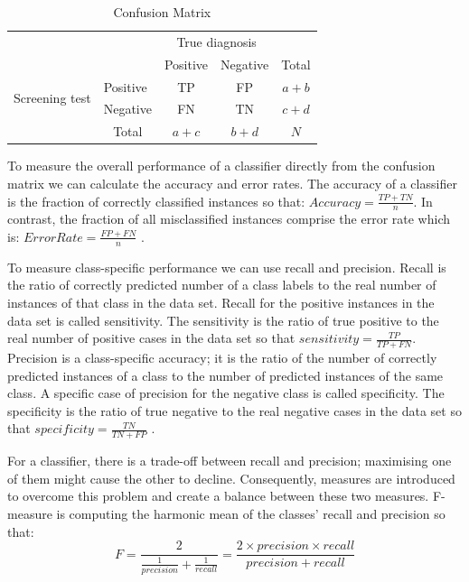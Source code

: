 \begin{table}[!h]
    \centering
    \begin{tabular}{l|l|c|c|c}
        \multicolumn{2}{c}{}&\multicolumn{2}{c}{True diagnosis}&\\
        \cline{3-4}
        \multicolumn{2}{c|}{}&Positive&Negative&\multicolumn{1}{c}{Total}\\
        \cline{2-4}
        \multirow{2}{*}{Screening test}& Positive & TP & FP & $a+b$\\
        \cline{2-4}
        & Negative & FN & TN & $c+d$\\
        \cline{2-4}
        \multicolumn{1}{c}{} & \multicolumn{1}{c}{Total} & \multicolumn{1}{c}{$a+c$} & \multicolumn{1}{c}{$b+d$} & \multicolumn{1}{c}{$N$}\\
    \end{tabular}
    \caption{Confusion Matrix}
    \label{tab:confusionMatrix}
\end{table}

To measure the overall performance of a classifier directly from the confusion matrix we can calculate the accuracy and error rates. The accuracy of a classifier is the fraction of correctly classified instances so that: $Accuracy = \frac{TP + TN}{n}$. In contrast, the fraction of all misclassified instances comprise the 
error rate which is: $Error Rate = \frac{FP + FN}{n}$ \cite{Fawcett2006}.

To measure class-specific performance we can use recall and precision. Recall is the ratio of correctly predicted number of a class labels to the real number of instances of that class in the data set. Recall for the positive instances in the data set is called sensitivity. The sensitivity is the ratio of true positive to the real number of positive cases in the data set so that $sensitivity = \frac{TP}{TP + FN}$. Precision is a class-specific accuracy; it is the ratio of the number of correctly predicted instances of a class to the number of predicted instances of the same class. A specific case of precision for the negative class is called specificity. The specificity is the ratio of true negative to the real negative cases in the data set so that $specificity = \frac{TN}{TN + FP}$ \cite{Fawcett2006}.

For a classifier, there is a trade-off between recall and precision; maximising one of them might cause the other to decline. Consequently, measures are introduced to overcome this problem and create a balance between these two measures. F-measure is computing the harmonic mean of the classes' recall and precision \cite{Zaki2014} so that:
\begin{equation*}
    F=\frac{2}{\frac{1}{precision} + \frac{1}{recall} } = \frac{2 \times precision \times recall}{precision + recall}
\end{equation*}


